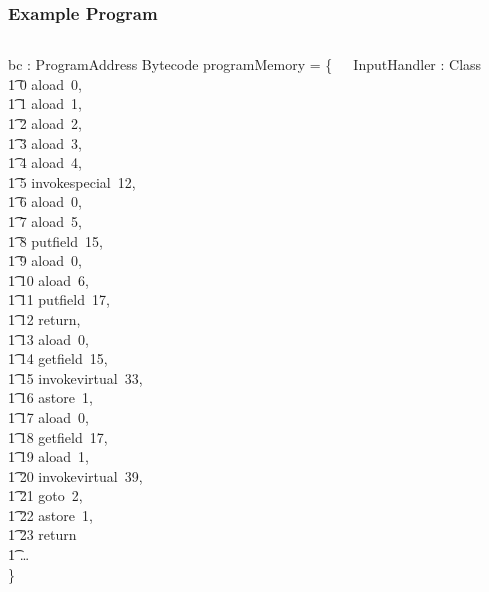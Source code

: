 \documentclass{beamer}
\begin{document}
\begin{frame}
  \frametitle{Example Program}
  \tiny
  \setlength{\zedleftsep}{0cm}
  \setlength{\zedindent}{0cm}
  \setlength{\zedtab}{0.3cm}
  \setlength{\abovedisplayskip}{0cm}
  \setlength{\abovedisplayshortskip}{0cm}
  \setlength{\belowdisplayskip}{0cm}
  \setlength{\belowdisplayshortskip}{0cm}
  \begin{columns}[T]
    \begin{axdef}
      bc : ProgramAddress \pfun Bytecode
    \where
      programMemory = \{ \\
      \t1 0 \mapsto aload~0, \\
      \t1 1 \mapsto aload~1, \\
      \t1 2 \mapsto aload~2, \\
      \t1 3 \mapsto aload~3, \\
      \t1 4 \mapsto aload~4, \\
      \t1 5 \mapsto invokespecial~12, \\
      \t1 6 \mapsto aload~0, \\
      \t1 7 \mapsto aload~5, \\
      \t1 8 \mapsto putfield~15, \\
      \t1 9 \mapsto aload~0, \\
      \t1 10 \mapsto aload~6, \\
      \t1 11 \mapsto putfield~17, \\
      \t1 12 \mapsto return, \\
      \t1 13 \mapsto aload~0, \\
      \t1 14 \mapsto getfield~15, \\
      \t1 15 \mapsto invokevirtual~33, \\
      \t1 16 \mapsto astore~1, \\
      \t1 17 \mapsto aload~0, \\
      \t1 18 \mapsto getfield~17, \\
      \t1 19 \mapsto aload~1, \\
      \t1 20 \mapsto invokevirtual~39, \\
      \t1 21 \mapsto goto~2, \\
      \t1 22 \mapsto astore~1, \\
      \t1 23 \mapsto return \\
      \t1 \dots \\
      \} 
    \end{axdef}
    \begin{axdef}
      InputHandler : Class

\end{axdef}
\end{columns}
\end{frame}
\end{document}

